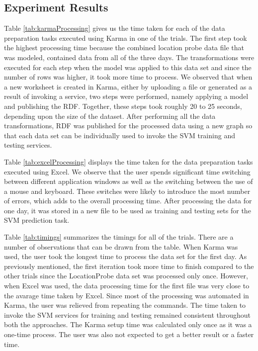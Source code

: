 \subsection{Experiment Results}
Table \ref{tab:karmaProcessing} gives us the time taken for each of the data preparation tasks executed using Karma in one of the trials. The first step took the highest processing time because the combined location probe data file that was modeled, contained data from all of the three days. The transformations were executed for each step when the model was applied to this data set and since the number of rows was higher, it took more time to process. We observed that when a new worksheet is created in Karma, either by uploading a file or generated as a result of invoking a service, two steps were performed, namely applying a model and publishing the RDF. Together, these steps took roughly 20 to 25 seconds, depending upon the size of the dataset. After performing all the data transformations, RDF was published for the processed data using a new graph so that each data set can be individually used to invoke the SVM training and testing services. 

Table \ref{tab:excelProcessing} displays the time taken for the data preparation tasks executed using Excel. We observe that the user spends significant time switching between different application windows as well as the switching between the use of a mouse and keyboard. These switches were likely to introduce the most number of errors, which adds to the overall processing time. After processing the data for one day, it was stored in a new file to be used as training and testing sets for the SVM prediction task.

Table \ref{tab:timings} summarizes the timings for all of the trials. There are a number of observations that can be drawn from the table. When Karma was used, the user took the longest time to process the data set for the first day. As previously mentioned, the first iteration took more time to finish compared to the other trials since the LocationProbe data set was processed only once. However, when Excel was used, the data processing time for the first file was very close to the avarage time taken by Excel. Since most of the processing was automated in Karma, the user was relieved from repeating the commands. The time taken to invoke the SVM services for training and testing remained consistent throughout both the approaches. The Karma setup time was calculated only once as it was a one-time process. The user was also not expected to get a better result or a faster time. 

